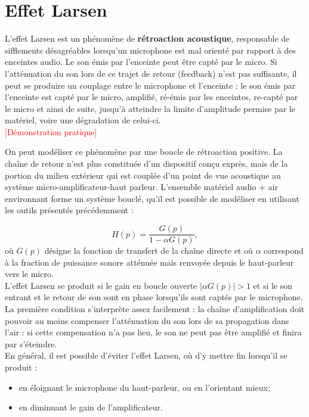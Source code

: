 \documentclass[11pt,a4paper]{report}
\begin{document}
\section{Effet Larsen}

L'effet Larsen est un phénomène de \textbf{rétroaction acoustique}, responsable de sifflements désagréables lorsqu'un microphone est mal orienté par rapport à des enceintes audio. Le son émis par l'enceinte peut être capté par le micro. Si l'atténuation du son lors de ce trajet de retour (feedback) n'est pas suffisante, il peut se produire un couplage entre le microphone et l'enceinte : le son émis par l'enceinte est capté par le micro, amplifié, ré-émis par les enceintes, re-capté par le micro et ainsi de suite, jusqu'à atteindre la limite d'amplitude permise par le matériel, voire une dégradation de celui-ci.\\

\textcolor{red}{[Démonstration pratique]} 

On peut modéliser ce phénomène par une boucle de rétroaction positive. La chaîne de retour n'est plus constituée d'un dispositif conçu exprès, mais de la portion du milieu extérieur qui est couplée d'un point de vue acoustique au système micro-amplificateur-haut parleur. L'ensemble matériel audio + air environnant forme un système bouclé, qu'il est possible de modéliser en utilisant les outils présentés précédemment :

\begin{equation}
	H(p) = \frac{G(p)}{1 - \alpha G(p)},
\end{equation}
où $G(p)$ désigne la fonction de transfert de la chaîne directe et où $\alpha$ correspond à la fraction de puissance sonore atténuée mais renvoyée depuis le haut-parleur vers le micro.\\

L'effet Larsen se produit si le gain en boucle ouverte $|\alpha G(p)| > 1$ et si le son entrant et le retour de son sont en phase lorsqu'ils sont captés par le microphone. La première condition s'interprète assez facilement : la chaîne d'amplification doit pouvoir au moins compenser l'atténuation du son lors de sa propagation dans l'air : si cette compensation n'a pas lieu, le son ne peut pas être amplifié et finira par s'éteindre.\\

En général, il est possible d'éviter l'effet Larsen, où d'y mettre fin lorsqu'il se produit :
\begin{itemize}
	\item en éloignant le microphone du haut-parleur, ou en l'orientant mieux;
	\item en diminuant le gain de l'amplificateur.
\end{itemize}
\end{document}
